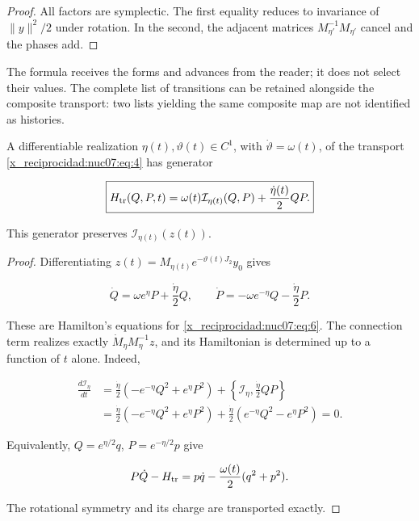 \begin{proof}
All factors are symplectic. The first equality reduces to invariance of \(\|y\|^2/2\) under rotation. In the second, the adjacent matrices \(M_{\eta'}^{-1}M_{\eta'}\) cancel and the phases add.
\end{proof}

The formula receives the forms and advances from the reader; it does not select their values. The complete list of transitions can be retained alongside the composite transport: two lists yielding the same composite map are not identified as histories.

\begin{proposition}
A differentiable realization \(\eta(t),\vartheta(t)\in C^1\), with \(\dot\vartheta=\omega(t)\), of the transport \eqref{x_reciprocidad:nuc07:eq:4} has generator

\begin{equation}
\boxed{
H_{\rm tr}(Q,P,t)=
\omega(t)\mathcal I_{\eta(t)}(Q,P)
+\frac{\dot\eta(t)}2 QP.}
\label{x_reciprocidad:nuc07:eq:6}
\end{equation}

This generator preserves \(\mathcal I_{\eta(t)}(z(t))\).
\end{proposition}

\begin{proof}
Differentiating \(z(t)=M_{\eta(t)}e^{-\vartheta(t)J_2}y_0\) gives

\[
\dot Q=\omega e^\eta P+\frac{\dot\eta}2Q,\qquad
\dot P=-\omega e^{-\eta}Q-\frac{\dot\eta}2P.
\]

These are Hamilton's equations for \eqref{x_reciprocidad:nuc07:eq:6}. The connection term realizes exactly \(\dot M_\eta M_\eta^{-1}z\), and its Hamiltonian is determined up to a function of \(t\) alone. Indeed,

\begin{equation}
\begin{aligned}
\frac{d\mathcal I_\eta}{dt}
&=\frac{\dot\eta}{2}(-e^{-\eta}Q^2+e^\eta P^2)
+\left\{\mathcal I_\eta,\frac{\dot\eta}{2}QP\right\}\\
&=\frac{\dot\eta}{2}(-e^{-\eta}Q^2+e^\eta P^2)
+\frac{\dot\eta}{2}(e^{-\eta}Q^2-e^\eta P^2)=0.
\end{aligned}
\label{x_reciprocidad:nuc07:eq:7}
\end{equation}

Equivalently, \(Q=e^{\eta/2}q\), \(P=e^{-\eta/2}p\) give

\begin{equation}
P\dot Q-H_{\rm tr}
=p\dot q-\frac{\omega(t)}2(q^2+p^2).
\label{x_reciprocidad:nuc07:eq:8}
\end{equation}

The rotational symmetry and its charge are transported exactly.
\end{proof}

